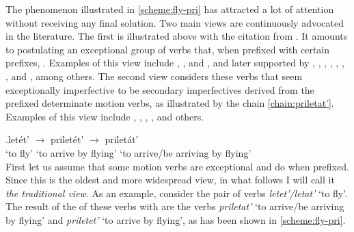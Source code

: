 The phenomenon illustrated in \ref{scheme:fly-pri} has attracted a lot of attention without receiving any final solution. Two main views are continuously advocated in the literature. The first is illustrated above with the citation from \citet{Titelbaum:90}. It amounts to postulating an exceptional group of verbs that, when prefixed with certain prefixes, . Examples of this view include \citet[46]{Meillet:1902}, \citet[5]{Mazon:1908}, and \citet{Vondrak:1908}, and later supported by \citet{Shaxmatov:41}, \citet{Gvozdev:73}, \citet{Vinogradov:72}, \citet{Townsend:75}, \citet{Shvedova:82}, \citet{Wade:92}, \citet{Nesset:08}, and \citet{Janda:10}, among others. The second view considers these verbs that seem exceptionally imperfective to be secondary imperfectives derived from the prefixed determinate motion verbs, as illustrated by the chain \ref{chain:priletat'}. Examples of this view include \citet{Regnell:44}, \citet[337-344]{Isachenko:60}, \citet[87-95]{ZaliznjakShmelev:00}, \citet{Romanova:06}, and others.

\exg.\label{chain:priletat'}{let\'{e}t'\textsuperscript{\IPF}} {$\to$} {prilet\'{e}t'\textsuperscript{\PF}} {$\to$} prilet\'{a}t'\textsuperscript{\IPF}\\
{`to fly'} {} {`to arrive by flying'} {} {`to arrive/be arriving by flying'}\\


First let us assume that some motion verbs are exceptional and do  when prefixed. Since this is the oldest and more widespread view, in what follows I will call it \textit{the traditional view}. As an example, consider the pair of verbs \textit{letet'/letat'} `to fly'. The result of the  of these verbs with  are the verbs \textit{priletat'}\textsuperscript{\IPF} `to arrive/be arriving by flying' and \textit{priletet'\textsuperscript{\PF}} `to arrive by flying', as has been shown in \ref{scheme:fly-pri}. 


